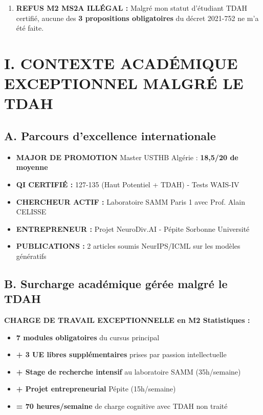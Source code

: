 \documentclass[12pt,french]{scrlttr2}
\begin{document}
\begin{letter}
\begin{enumerate}
\item \textbf{REFUS M2 MS2A ILLÉGAL :} Malgré mon statut d'étudiant TDAH certifié, aucune des \textbf{3 propositions obligatoires} du décret 2021-752 ne m'a été faite.
\end{enumerate}

\section*{I. CONTEXTE ACADÉMIQUE EXCEPTIONNEL MALGRÉ LE TDAH}

\subsection*{A. Parcours d'excellence internationale}

\begin{itemize}[leftmargin=*, itemsep=2pt]
\item \textbf{MAJOR DE PROMOTION} Master USTHB Algérie : \colorbox{yellow!30}{\textbf{18,5/20 de moyenne}}
\item \textbf{QI CERTIFIÉ :} 127-135 (Haut Potentiel + TDAH) - Tests WAIS-IV
\item \textbf{CHERCHEUR ACTIF :} Laboratoire SAMM Paris 1 avec Prof. Alain CELISSE
\item \textbf{ENTREPRENEUR :} Projet NeuroDiv.AI - Pépite Sorbonne Université
\item \textbf{PUBLICATIONS :} 2 articles soumis NeurIPS/ICML sur les modèles génératifs
\end{itemize}

\subsection*{B. Surcharge académique gérée malgré le TDAH}

\textbf{CHARGE DE TRAVAIL EXCEPTIONNELLE en M2 Statistiques :}
\begin{itemize}[leftmargin=*, itemsep=2pt]
\item \textbf{7 modules obligatoires} du cursus principal
\item \textbf{+ 3 UE libres supplémentaires} prises par passion intellectuelle
\item \textbf{+ Stage de recherche intensif} au laboratoire SAMM (35h/semaine)
\item \textbf{+ Projet entrepreneurial} Pépite (15h/semaine)
\item \textbf{= 70 heures/semaine} de charge cognitive avec TDAH non traité
\end{itemize}


\end{letter}
\end{document}
